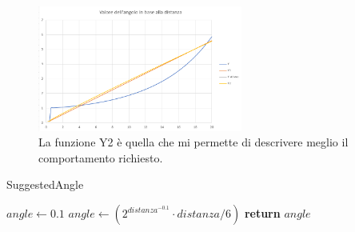 \begin{figure}
	\centering
	\includegraphics[width=0.6\textwidth]{Immagini/Funzionedistanza.png}
	\caption{La funzione Y2 è quella che mi permette di descrivere meglio il comportamento richiesto.}
	\label{fig:fundis}
\end{figure}

\begin{algorithm}
	\caption{SuggestedAngle}
	\label{alg:suggestedangle}
	\begin{algorithmic}
		\State $angle \gets 0.1$
		\State $angle \gets (2^{distanza^{-0.1}}\cdot distanza/6)$
		\EndIf
		\State \textbf{return} $angle$
		\EndFunction
	\end{algorithmic}
\end{algorithm}